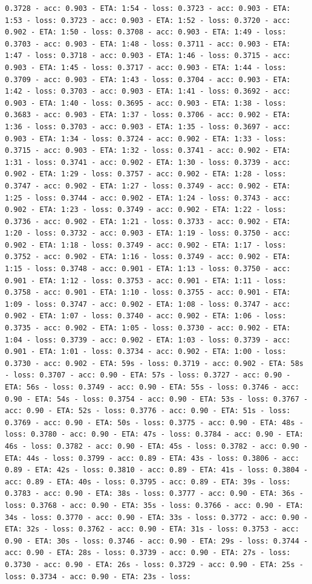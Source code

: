 \documentclass[11pt]{article}
\begin{document}
\begin{Verbatim}[commandchars=\\\{\}]
0.3728 - acc: 0.903 - ETA: 1:54 - loss: 0.3723 - acc: 0.903 - ETA: 1:53 - loss: 0.3723 - acc: 0.903 - ETA: 1:52 - loss: 0.3720 - acc: 0.902 - ETA: 1:50 - loss: 0.3708 - acc: 0.903 - ETA: 1:49 - loss: 0.3703 - acc: 0.903 - ETA: 1:48 - loss: 0.3711 - acc: 0.903 - ETA: 1:47 - loss: 0.3718 - acc: 0.903 - ETA: 1:46 - loss: 0.3715 - acc: 0.903 - ETA: 1:45 - loss: 0.3717 - acc: 0.903 - ETA: 1:44 - loss: 0.3709 - acc: 0.903 - ETA: 1:43 - loss: 0.3704 - acc: 0.903 - ETA: 1:42 - loss: 0.3703 - acc: 0.903 - ETA: 1:41 - loss: 0.3692 - acc: 0.903 - ETA: 1:40 - loss: 0.3695 - acc: 0.903 - ETA: 1:38 - loss: 0.3683 - acc: 0.903 - ETA: 1:37 - loss: 0.3706 - acc: 0.902 - ETA: 1:36 - loss: 0.3703 - acc: 0.903 - ETA: 1:35 - loss: 0.3697 - acc: 0.903 - ETA: 1:34 - loss: 0.3724 - acc: 0.902 - ETA: 1:33 - loss: 0.3715 - acc: 0.903 - ETA: 1:32 - loss: 0.3741 - acc: 0.902 - ETA: 1:31 - loss: 0.3741 - acc: 0.902 - ETA: 1:30 - loss: 0.3739 - acc: 0.902 - ETA: 1:29 - loss: 0.3757 - acc: 0.902 - ETA: 1:28 - loss: 0.3747 - acc: 0.902 - ETA: 1:27 - loss: 0.3749 - acc: 0.902 - ETA: 1:25 - loss: 0.3744 - acc: 0.902 - ETA: 1:24 - loss: 0.3743 - acc: 0.902 - ETA: 1:23 - loss: 0.3749 - acc: 0.902 - ETA: 1:22 - loss: 0.3736 - acc: 0.902 - ETA: 1:21 - loss: 0.3733 - acc: 0.902 - ETA: 1:20 - loss: 0.3732 - acc: 0.903 - ETA: 1:19 - loss: 0.3750 - acc: 0.902 - ETA: 1:18 - loss: 0.3749 - acc: 0.902 - ETA: 1:17 - loss: 0.3752 - acc: 0.902 - ETA: 1:16 - loss: 0.3749 - acc: 0.902 - ETA: 1:15 - loss: 0.3748 - acc: 0.901 - ETA: 1:13 - loss: 0.3750 - acc: 0.901 - ETA: 1:12 - loss: 0.3753 - acc: 0.901 - ETA: 1:11 - loss: 0.3758 - acc: 0.901 - ETA: 1:10 - loss: 0.3755 - acc: 0.901 - ETA: 1:09 - loss: 0.3747 - acc: 0.902 - ETA: 1:08 - loss: 0.3747 - acc: 0.902 - ETA: 1:07 - loss: 0.3740 - acc: 0.902 - ETA: 1:06 - loss: 0.3735 - acc: 0.902 - ETA: 1:05 - loss: 0.3730 - acc: 0.902 - ETA: 1:04 - loss: 0.3739 - acc: 0.902 - ETA: 1:03 - loss: 0.3739 - acc: 0.901 - ETA: 1:01 - loss: 0.3734 - acc: 0.902 - ETA: 1:00 - loss: 0.3730 - acc: 0.902 - ETA: 59s - loss: 0.3719 - acc: 0.902 - ETA: 58s - loss: 0.3707 - acc: 0.90 - ETA: 57s - loss: 0.3727 - acc: 0.90 - ETA: 56s - loss: 0.3749 - acc: 0.90 - ETA: 55s - loss: 0.3746 - acc: 0.90 - ETA: 54s - loss: 0.3754 - acc: 0.90 - ETA: 53s - loss: 0.3767 - acc: 0.90 - ETA: 52s - loss: 0.3776 - acc: 0.90 - ETA: 51s - loss: 0.3769 - acc: 0.90 - ETA: 50s - loss: 0.3775 - acc: 0.90 - ETA: 48s - loss: 0.3780 - acc: 0.90 - ETA: 47s - loss: 0.3784 - acc: 0.90 - ETA: 46s - loss: 0.3782 - acc: 0.90 - ETA: 45s - loss: 0.3782 - acc: 0.90 - ETA: 44s - loss: 0.3799 - acc: 0.89 - ETA: 43s - loss: 0.3806 - acc: 0.89 - ETA: 42s - loss: 0.3810 - acc: 0.89 - ETA: 41s - loss: 0.3804 - acc: 0.89 - ETA: 40s - loss: 0.3795 - acc: 0.89 - ETA: 39s - loss: 0.3783 - acc: 0.90 - ETA: 38s - loss: 0.3777 - acc: 0.90 - ETA: 36s - loss: 0.3768 - acc: 0.90 - ETA: 35s - loss: 0.3766 - acc: 0.90 - ETA: 34s - loss: 0.3770 - acc: 0.90 - ETA: 33s - loss: 0.3772 - acc: 0.90 - ETA: 32s - loss: 0.3762 - acc: 0.90 - ETA: 31s - loss: 0.3753 - acc: 0.90 - ETA: 30s - loss: 0.3746 - acc: 0.90 - ETA: 29s - loss: 0.3744 - acc: 0.90 - ETA: 28s - loss: 0.3739 - acc: 0.90 - ETA: 27s - loss: 0.3730 - acc: 0.90 - ETA: 26s - loss: 0.3729 - acc: 0.90 - ETA: 25s - loss: 0.3734 - acc: 0.90 - ETA: 23s - loss: 
\end{Verbatim}
\end{document}
